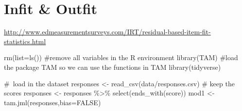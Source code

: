 \documentclass[
  letterpaper,
  DIV=11,
  numbers=noendperiod]{scrreprt}
\newenvironment{Shaded}{\begin{snugshade}}{\end{snugshade}}
\newcommand{\AttributeTok}[1]{\textcolor[rgb]{0.40,0.45,0.13}{#1}}
\newcommand{\CommentTok}[1]{\textcolor[rgb]{0.37,0.37,0.37}{#1}}
\newcommand{\ConstantTok}[1]{\textcolor[rgb]{0.56,0.35,0.01}{#1}}
\newcommand{\FunctionTok}[1]{\textcolor[rgb]{0.28,0.35,0.67}{#1}}
\newcommand{\NormalTok}[1]{\textcolor[rgb]{0.00,0.23,0.31}{#1}}
\newcommand{\OtherTok}[1]{\textcolor[rgb]{0.00,0.23,0.31}{#1}}
\newcommand{\SpecialCharTok}[1]{\textcolor[rgb]{0.37,0.37,0.37}{#1}}
\newcommand{\StringTok}[1]{\textcolor[rgb]{0.13,0.47,0.30}{#1}}
\begin{document}
\hypertarget{infit-outfit}{%
\chapter{Infit \& Outfit}\label{infit-outfit}}

\url{http://www.edmeasurementsurveys.com/IRT/residual-based-item-fit-statistics.html}

\begin{Shaded}
\begin{Highlighting}[]
\FunctionTok{rm}\NormalTok{(}\AttributeTok{list=}\FunctionTok{ls}\NormalTok{())  }\CommentTok{\#remove all variables in the R environment}
\FunctionTok{library}\NormalTok{(TAM)  }\CommentTok{\#load the package TAM so we can use the functions in TAM}
\FunctionTok{library}\NormalTok{(tidyverse)}

\CommentTok{\# load in the dataset}
\NormalTok{responses }\OtherTok{\textless{}{-}} \FunctionTok{read\_csv}\NormalTok{(}\StringTok{\textquotesingle{}data/responses.csv\textquotesingle{}}\NormalTok{)}
\CommentTok{\# keep the scores}
\NormalTok{responses }\OtherTok{\textless{}{-}}\NormalTok{ responses }\SpecialCharTok{\%\textgreater{}\%} \FunctionTok{select}\NormalTok{(}\FunctionTok{ends\_with}\NormalTok{(}\StringTok{\textquotesingle{}score\textquotesingle{}}\NormalTok{))}
\NormalTok{mod1 }\OtherTok{\textless{}{-}} \FunctionTok{tam.jml}\NormalTok{(responses,}\AttributeTok{bias=}\ConstantTok{FALSE}\NormalTok{)}
\end{Highlighting}
\end{Shaded}
\end{document}
